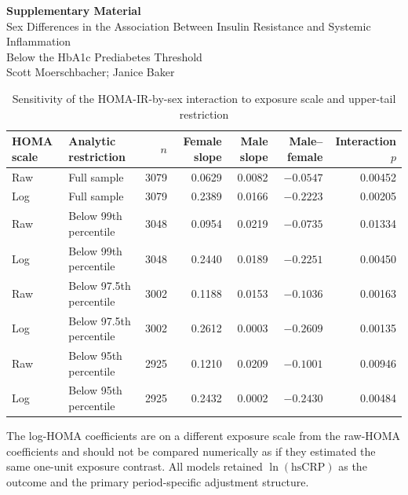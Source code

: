 \documentclass[11pt]{article}
\begin{document}
\begin{center}
{\Large\bfseries Supplementary Material}\\[0.5em]
{\large Sex Differences in the Association Between Insulin Resistance and Systemic Inflammation}\\
{\large Below the HbA1c Prediabetes Threshold}\\[0.5em]
Scott Moerschbacher; Janice Baker
\end{center}

\setcounter{table}{0}


\begin{table}[htbp]
\centering
\caption{Sensitivity of the HOMA-IR-by-sex interaction to exposure scale and upper-tail restriction}
\label{tab:s1_scale_tail}
\begin{threeparttable}
\small
\begin{tabular}{llrrrrr}
\toprule
HOMA scale & Analytic restriction & $n$ & Female slope & Male slope &
Male--female & Interaction $p$ \\
\midrule
Raw & Full sample & 3079 & 0.0629 & 0.0082 & $-0.0547$ & 0.00452 \\
Log & Full sample & 3079 & 0.2389 & 0.0166 & $-0.2223$ & 0.00205 \\
Raw & Below 99th percentile & 3048 & 0.0954 & 0.0219 & $-0.0735$ & 0.01334 \\
Log & Below 99th percentile & 3048 & 0.2440 & 0.0189 & $-0.2251$ & 0.00450 \\
Raw & Below 97.5th percentile & 3002 & 0.1188 & 0.0153 & $-0.1036$ & 0.00163 \\
Log & Below 97.5th percentile & 3002 & 0.2612 & 0.0003 & $-0.2609$ & 0.00135 \\
Raw & Below 95th percentile & 2925 & 0.1210 & 0.0209 & $-0.1001$ & 0.00946 \\
Log & Below 95th percentile & 2925 & 0.2432 & 0.0002 & $-0.2430$ & 0.00484 \\
\bottomrule
\end{tabular}
\begin{tablenotes}[flushleft]
\footnotesize
\item The log-HOMA coefficients are on a different exposure scale from the raw-HOMA
coefficients and should not be compared numerically as if they estimated the same
one-unit exposure contrast. All models retained $\ln(\mathrm{hsCRP})$ as the outcome
and the primary period-specific adjustment structure.
\end{tablenotes}
\end{threeparttable}
\end{table}
\end{document}
